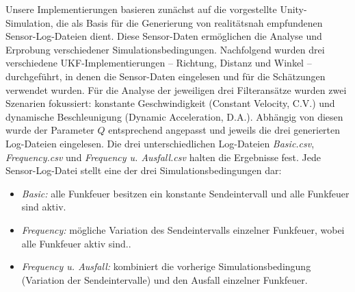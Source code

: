 \documentclass[conference]{IEEEtran}[10pt]
\begin{document}
Unsere Implementierungen basieren zunächst auf die vorgestellte Unity-Simulation, die als Basis für die Generierung von realitätsnah empfundenen Sensor-Log-Dateien dient. Diese Sensor-Daten ermöglichen die Analyse und Erprobung verschiedener Simulationsbedingungen. Nachfolgend wurden drei verschiedene UKF-Implementierungen -- Richtung, Distanz und Winkel --durchgeführt, in denen die Sensor-Daten eingelesen und für die Schätzungen verwendet wurden. Für die Analyse der jeweiligen drei Filteransätze wurden zwei Szenarien fokussiert: konstante Geschwindigkeit (Constant Velocity, C.V.) und dynamische Beschleunigung (Dynamic Acceleration, D.A.). Abhängig von diesen wurde der Parameter \(Q\) entsprechend angepasst und jeweils die drei generierten Log-Dateien eingelesen. Die drei unterschiedlichen Log-Dateien \textit{Basic.csv}, \textit{Frequency.csv} und \textit{Frequency u. Ausfall.csv} halten die Ergebnisse fest. Jede Sensor-Log-Datei stellt eine der drei Simulationsbedingungen dar: 
\begin{itemize}
    \item \textit{Basic:} alle Funkfeuer besitzen ein konstante Sendeintervall und alle Funkfeuer sind aktiv.
    \item \textit{Frequency:} mögliche Variation des Sendeintervalls einzelner Funkfeuer, wobei alle Funkfeuer aktiv sind..
    \item \textit{Frequency u. Ausfall:} kombiniert die vorherige Simulationsbedingung (Variation der Sendeintervalle) und den Ausfall einzelner Funkfeuer.
\end{itemize}
\end{document}
